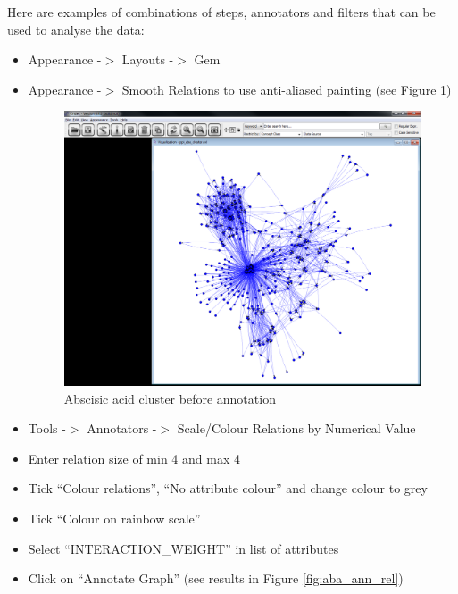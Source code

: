 Here are examples of combinations of steps, annotators and filters that can be used to analyse the data:
\begin{itemize}
\item Appearance -$>$ Layouts -$>$ Gem
\item Appearance -$>$ Smooth Relations to use anti-aliased painting (see Figure \ref{fig:aba_cluster_no_ann})

\begin{figure}[H]
\centering
\includegraphics[scale=0.35]{images/Oct12/aba_cluster_no_ann.png} 
\caption{Abscisic acid cluster before annotation}
\label{fig:aba_cluster_no_ann}
\end{figure}

\item Tools -$>$ Annotators -$>$ Scale/Colour Relations by Numerical Value
\item Enter relation size of min 4 and max 4
\item Tick ``Colour relations'', ``No attribute colour'' and change colour to grey
\item Tick ``Colour on rainbow scale''
\item Select ``INTERACTION\_WEIGHT'' in list of attributes
\item Click on ``Annotate Graph'' (see results in Figure \ref{fig:aba_ann_rel})


\end{itemize}
